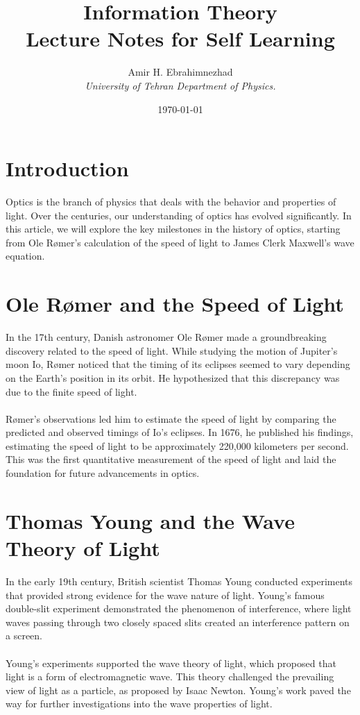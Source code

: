 \documentclass[9pt,a4paper, twocolumn]{article}
\title{Information Theory \\ \large Lecture Notes for Self Learning}
\date{\today}
\author{Amir H. Ebrahimnezhad \\ \small \textit{University of Tehran Department of Physics.}}
\newcounter{theo}
\begin{document}
    \maketitle
    \section{Introduction}
        Optics is the branch of physics that deals with the behavior and properties of light. Over the centuries, our understanding of optics has evolved significantly. In this article, we will explore the key milestones in the history of optics, starting from Ole Rømer's calculation of the speed of light to James Clerk Maxwell's wave equation.
    \section{Ole Rømer and the Speed of Light}
        In the 17th century, Danish astronomer Ole Rømer made a groundbreaking discovery related to the speed of light. While studying the motion of Jupiter's moon Io, Rømer noticed that the timing of its eclipses seemed to vary depending on the Earth's position in its orbit. He hypothesized that this discrepancy was due to the finite speed of light.
    \\
    \\
        Rømer's observations led him to estimate the speed of light by comparing the predicted and observed timings of Io's eclipses. In 1676, he published his findings, estimating the speed of light to be approximately 220,000 kilometers per second. This was the first quantitative measurement of the speed of light and laid the foundation for future advancements in optics.
    \section{Thomas Young and the Wave Theory of Light}
        In the early 19th century, British scientist Thomas Young conducted experiments that provided strong evidence for the wave nature of light. Young's famous double-slit experiment demonstrated the phenomenon of interference, where light waves passing through two closely spaced slits created an interference pattern on a screen.
    \\
    \\
        Young's experiments supported the wave theory of light, which proposed that light is a form of electromagnetic wave. This theory challenged the prevailing view of light as a particle, as proposed by Isaac Newton. Young's work paved the way for further investigations into the wave properties of light.
\end{document}
